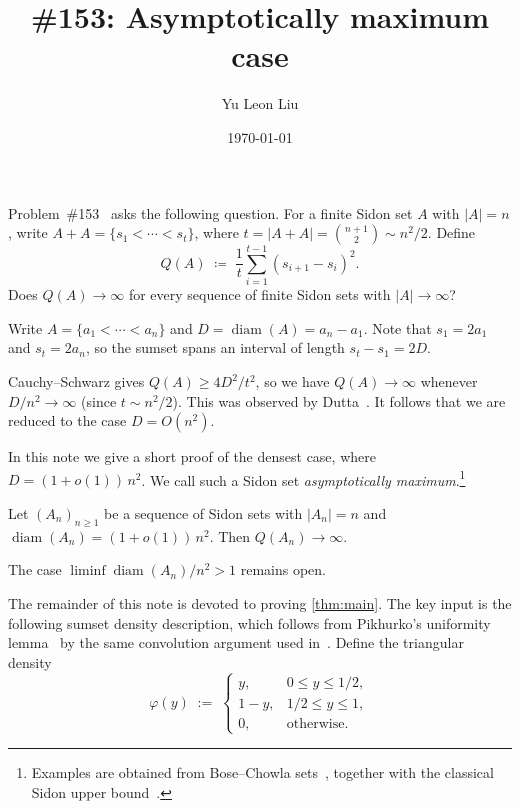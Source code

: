 \documentclass[11pt]{amsart}
\title{\Erdos \#153: Asymptotically maximum case}
\author{Yu Leon Liu}
\date{\today}
\begin{document}
\maketitle

\Erdos Problem~\#153~\cite{bloom153} asks the following question.
For a finite Sidon set $A$ with $|A| = n$, write $A + A = \{s_1 < \cdots < s_t\}$, where $t = |A+A| = \binom{n+1}{2} \sim n^2/2$. Define
\[
Q(A) \;\coloneqq\; \frac{1}{t}\sum_{i=1}^{t-1}(s_{i+1} - s_i)^2.
\]
Does $Q(A) \to \infty$ for every sequence of finite Sidon sets with $|A| \to \infty$?

Write $A = \{a_1 < \cdots < a_n\}$ and $D = \operatorname{diam}(A) = a_n - a_1$. Note that $s_1 = 2a_1$ and $s_t = 2a_n$, so the sumset spans an interval of length $s_t - s_1 = 2D$.
\begin{observation}\label{rem:sparse}
Cauchy--Schwarz gives $Q(A) \geq 4D^2/t^2$, so we have $Q(A) \to \infty$ whenever $D/n^2 \to \infty$ (since $t \sim n^2/2$). This was observed by Dutta~\cite{dutta153post}. It follows that we are reduced to the case $D = O(n^2)$.
\end{observation}

In this note we give a short proof of the densest case, where $D = (1 + o(1))\,n^2$. We call such a Sidon set \emph{asymptotically maximum}.\footnote{Examples are obtained from Bose--Chowla sets~\cite{BoseChowla1962}, together with the classical Sidon upper bound~\cite{ErdosTuran1941}.}
\begin{theorem}\label{thm:main}
Let $(A_n)_{n \geq 1}$ be a sequence of Sidon sets with $|A_n| = n$ and $\operatorname{diam}(A_n) = (1 + o(1))\,n^2$. Then $Q(A_n) \to \infty$.
\end{theorem}
\begin{remark}
The case $\liminf \operatorname{diam}(A_n)/n^2 > 1$ remains open.
\end{remark}

The remainder of this note is devoted to proving \cref{thm:main}.
The key input is the following sumset density description, which follows from Pikhurko's uniformity lemma~\cite[Lemma~10]{Pikhurko2006} by the same convolution argument used in~\cite[Lemma~10]{liu819}. Define the triangular density
\[
\varphi(y) \;:=\; \begin{cases} y, & 0 \leq y \leq 1/2, \\ 1 - y, & 1/2 \leq y \leq 1, \\ 0, & \text{otherwise.} \end{cases}
\]
\end{document}
